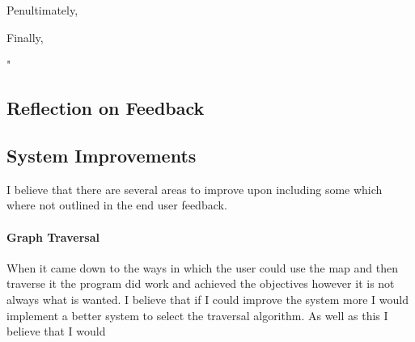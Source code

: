 \begin{FlushLeft}
\begin{enumerate}
        Penultimately, \\ \bk
        
        Finally, \\ \bk


        " \\ \BK 

    \end{enumerate}
    \BK

    \subsection{Reflection on Feedback}

    \subsection {System Improvements}
    I believe that there are several areas to improve upon including some which where not outlined in the end user feedback. \\ \bk

    \paragraph*{Graph Traversal} \mbox{}
    When it came down to the ways in which the user could use the map and then traverse it the program did work and achieved the objectives however it is not always what is wanted. I believe that if I could improve the system more I would implement a better system to select the traversal algorithm. As well as this I believe that I would
    
    \BK


\end{FlushLeft}